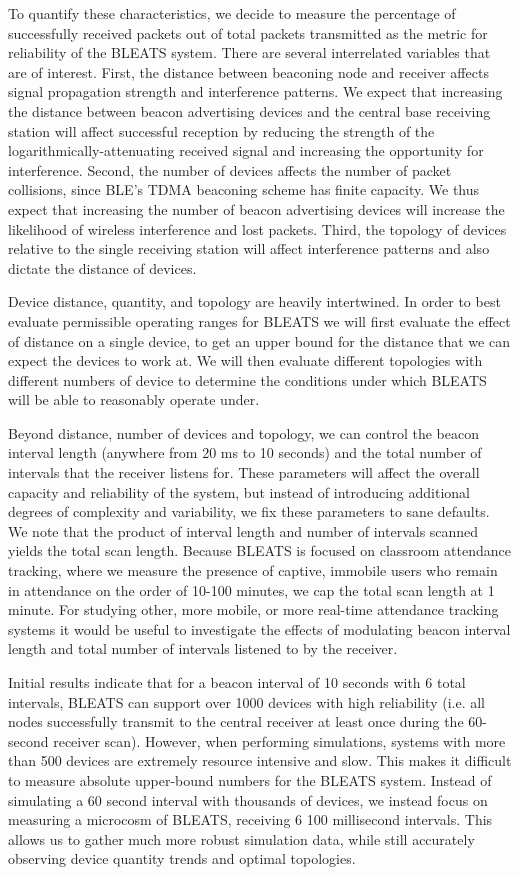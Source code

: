 To quantify these characteristics, we decide to measure the percentage of
successfully received packets out of total packets transmitted as the metric
for reliability of the BLEATS system. There are several interrelated variables
that are of interest. First, the distance between beaconing node and receiver
affects signal propagation strength and interference patterns. We expect that
increasing the distance between beacon advertising devices and the central base
receiving station will affect successful reception by reducing the strength of
the logarithmically-attenuating received signal and increasing the opportunity
for interference. Second, the number of devices affects the number of packet
collisions, since BLE's TDMA beaconing scheme has finite capacity. We thus
expect that increasing the number of beacon advertising devices will increase
the likelihood of wireless interference and lost packets. Third, the topology
of devices relative to the single receiving station will affect interference
patterns and also dictate the distance of devices. 

Device distance, quantity, and topology are heavily intertwined. In order to
best evaluate permissible operating ranges for BLEATS we will first evaluate
the effect of distance on a single device, to get an upper bound for the
distance that we can expect the devices to work at. We will then evaluate
different topologies with different numbers of device to determine the
conditions under which BLEATS will be able to reasonably operate under. 

Beyond distance, number of devices and topology, we can control the beacon
interval length (anywhere from 20 ms to 10 seconds) and the total number of
intervals that the receiver listens for. These parameters will affect the
overall capacity and reliability of the system, but instead of introducing
additional degrees of complexity and variability, we fix these parameters to
sane defaults. We note that the product of interval length and number of
intervals scanned yields the total scan length. Because BLEATS is focused on
classroom attendance tracking, where we measure the presence of captive,
immobile users who remain in attendance on the order of 10-100 minutes, we cap
the total scan length at 1 minute. For studying other, more mobile, or more
real-time attendance tracking systems it would be useful to investigate the
effects of modulating beacon interval length and total number of intervals
listened to by the receiver.

Initial results indicate that for a beacon interval of 10 seconds with 6 total
intervals, BLEATS can support over 1000 devices with high reliability (i.e. all
nodes successfully transmit to the central receiver at least once during the
60-second receiver scan). However, when performing simulations, systems with
more than 500 devices are extremely resource intensive and slow. This makes it
difficult to measure absolute upper-bound numbers for the BLEATS system. Instead
of simulating a 60 second interval with thousands of devices, we instead focus
on measuring a microcosm of BLEATS, receiving 6 100 millisecond intervals. This
allows us to gather much more robust simulation data, while still accurately
observing device quantity trends and optimal topologies.

